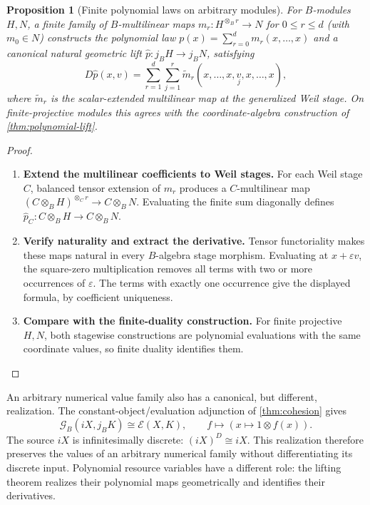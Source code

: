 \documentclass[11pt,a4paper]{article}
\numberwithin{algorithm}{section}
\numberwithin{equation}{section}
\newtheorem{proposition}[proposition]{Proposition}
\theoremstyle{definition}
\theoremstyle{remark}
\theoremstyle{plain}
\newcommand{\E}{\mathcal E}
\newcommand{\eps}{\varepsilon}
\newcommand{\Geo}{\mathcal G_B}
\theoremstyle{definition}
\theoremstyle{plain}
\begin{document}
\begin{proposition}[Finite polynomial laws on arbitrary modules]
\label{prop:polynomial-laws}
For $B$-modules $H,N$, a finite family of $B$-multilinear maps
$m_r:H^{\otimes_B r}\to N$ for $0\le r\le d$ (with $m_0\in N$)
constructs the polynomial law
$p(x)=\sum_{r=0}^d m_r(x,\ldots,x)$ and a canonical natural
geometric lift $\widehat p:j_BH\to j_BN$, satisfying
\[
 D\widehat p(x,v)=
 \sum_{r=1}^d\sum_{j=1}^r
 \widetilde m_r(x,\ldots,x,\underset{j}{v},x,\ldots,x),
\]
where $\widetilde m_r$ is the scalar-extended multilinear map at
the generalized Weil stage.  On finite-projective modules this
agrees with the coordinate-algebra
construction of \cref{thm:polynomial-lift}.
\end{proposition}
\begin{proof}\leavevmode
\begin{enumerate}[leftmargin=*,align=left]
\item \textbf{Extend the multilinear coefficients to Weil stages.}
For each Weil stage $C$, balanced tensor extension of $m_r$
produces a $C$-multilinear map
$(C\otimes_BH)^{\otimes_Cr}\to C\otimes_BN$.
Evaluating the finite sum diagonally defines
$\widehat p_C:C\otimes_BH\to C\otimes_BN$.

\item \textbf{Verify naturality and extract the derivative.}
Tensor functoriality makes these maps natural in every
$B$-algebra stage morphism.  Evaluating at $x+\eps v$,
the square-zero multiplication removes all terms with two or
more occurrences of $\eps$.  The terms with exactly one
occurrence give the displayed formula, by coefficient uniqueness.

\item \textbf{Compare with the finite-duality construction.}
For finite projective $H,N$, both stagewise constructions are
polynomial evaluations with the same coordinate values, so
finite duality identifies them.
\end{enumerate}
\end{proof}

An arbitrary numerical value family also has a canonical, but
different, realization.  The constant-object/evaluation adjunction
of \cref{thm:cohesion} gives
\[
 \Geo(iX,j_BK)\cong\E(X,K),
 \qquad f\longmapsto(x\mapsto1\otimes f(x)).
\]
The source $iX$ is infinitesimally discrete:
$(iX)^D\cong iX$. This realization therefore preserves the values
of an arbitrary numerical family without differentiating its discrete
input. Polynomial resource variables have a different role:
the lifting theorem realizes their polynomial maps geometrically
and identifies their derivatives.
\end{document}
